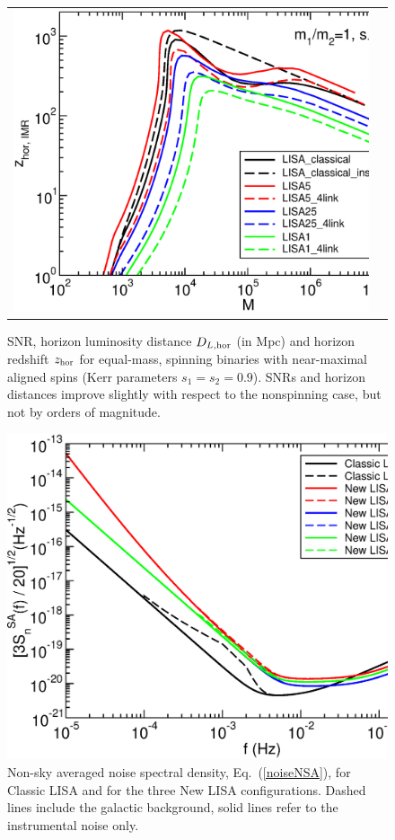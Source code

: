 \documentclass{iopart}
\begin{document}
\begin{figure}[H]
\begin{center}
\begin{tabular}{cc}
\includegraphics[scale=0.33,clip=true]{FigEmanuele/zhorIMRSpin09.eps}\\
\end{tabular}
\caption{\label{fig:spin} SNR, horizon luminosity distance $D_{L, {\rm hor}}$
  (in Mpc) and horizon redshift $z_{\rm hor}$ for equal-mass, spinning
  binaries with near-maximal aligned spins (Kerr parameters
  $s_1=s_2=0.9$). SNRs and horizon distances improve slightly with respect to
  the nonspinning case, but not by orders of magnitude.}
\end{center}
\end{figure}
%

%
\begin{figure}[H]
\begin{center}
\includegraphics[scale=0.33,clip=true]{FigEmanuele/noise.eps}
\caption{\label{fig:PSD}
  Non-sky averaged noise spectral density, Eq.~(\ref{noiseNSA}), for Classic
  LISA and for the three New LISA configurations. Dashed lines include the
  galactic background, solid lines refer to the instrumental noise only.}
\end{center}
\end{figure}
%
\end{document}
